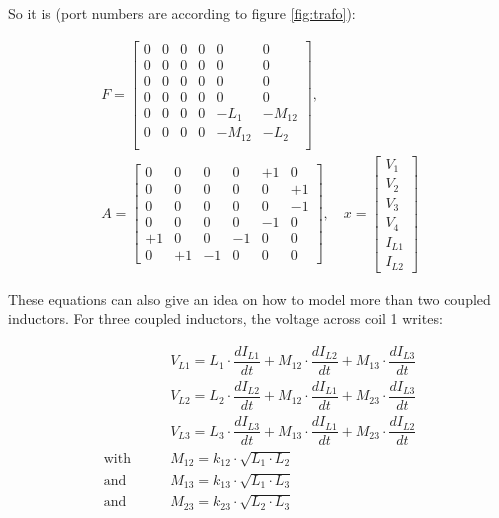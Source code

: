 So it is (port numbers are according to figure \ref{fig:trafo}):

\begin{equation}
\begin{gathered}
F=
\begin{bmatrix}
0 & 0 & 0 & 0 & 0 & 0\\
0 & 0 & 0 & 0 & 0 & 0\\
0 & 0 & 0 & 0 & 0 & 0\\
0 & 0 & 0 & 0 & 0 & 0\\
0 & 0 & 0 & 0 & -L_1 & -M_{12}\\
0 & 0 & 0 & 0 & -M_{12} & -L_2\\
\end{bmatrix},\\
A=
\begin{bmatrix}
0 & 0 & 0 & 0 & +1 &  0\\
0 & 0 & 0 & 0 &  0 & +1\\
0 & 0 & 0 & 0 &  0 & -1\\
0 & 0 & 0 & 0 & -1 &  0\\
+1 & 0 & 0 & -1 & 0 & 0\\
0 & +1 & -1 & 0 & 0 & 0
\end{bmatrix},\quad
x=
\begin{bmatrix}
V_1\\
V_2\\
V_3\\
V_4\\
I_{L1}\\
I_{L2}
\end{bmatrix}
\end{gathered}
\end{equation}

These equations can also give an idea on how to model more than two
coupled inductors. For three coupled inductors, the voltage across
coil 1 writes:

\begin{align}
 & V_{L1} = L_1\cdot\dfrac{d I_{L1}}{d t} + M_{12}\cdot\dfrac{d I_{L2}}{d t}
          + M_{13}\cdot\dfrac{d I_{L3}}{d t} \\
 & V_{L2} = L_2\cdot\dfrac{d I_{L2}}{d t} + M_{12}\cdot\dfrac{d I_{L1}}{d t}
          + M_{23}\cdot\dfrac{d I_{L3}}{d t} \\
 & V_{L3} = L_3\cdot\dfrac{d I_{L3}}{d t} + M_{13}\cdot\dfrac{d I_{L1}}{d t}
          + M_{23}\cdot\dfrac{d I_{L2}}{d t} \\
\text{with}\qquad & M_{12} = k_{12}\cdot\sqrt{L_1\cdot L_2} \\
\text{and}\qquad  & M_{13} = k_{13}\cdot\sqrt{L_1\cdot L_3} \\
\text{and}\qquad  & M_{23} = k_{23}\cdot\sqrt{L_2\cdot L_3}
\end{align}

